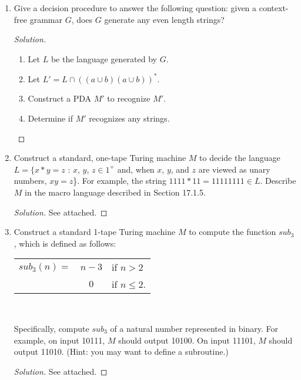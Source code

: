 \documentclass[10pt]{article}
\begin{document}
\begin{enumerate}[1)]

\item
Give a decision procedure to answer the following question: given a context-free grammar $G$, does $G$ generate any even length strings?
\begin{proof}[Solution]$ $\\
\begin{enumerate}[1.]
\item
Let $L$ be the language generated by $G$.
\item
Let $L' = L \cap ((a \cup b)(a \cup b))^*$.
\item
Construct a PDA $M'$ to recognize $M'$.
\item
Determine if $M'$ recognizes any strings.
\end{enumerate}
\end{proof}


\item
Construct a standard, one-tape Turing machine $M$ to decide the language $L = \{x * y = z$ : $x$, $y$, $z \in 1^+$ and, when  $x$,  $y$, and  $z$ are viewed as unary numbers,  $xy =  z$\}.  For example, the string  $1111*11=11111111 \in L$.  Describe $M$ in the macro language described in Section 17.1.5.
\begin{proof}[Solution]
See attached.
\end{proof}


\pagebreak

\item
Construct a standard 1-tape Turing machine $M$ to compute the function $sub_3$, which is defined as follows:
\begin{center}
\begin{tabular}{l c l}
$sub_3(n) =$&$n-3$ &if $n > 2$\\
&$0$&if $n \leq 2$.\\
\end{tabular}\\
\end{center}
Specifically, compute  $sub_3$ of a natural number represented in binary.  For example, on input 10111, $M$ should output 10100.  On input 11101, $M$ should output 11010.  (Hint: you may want to define a subroutine.)
\begin{proof}[Solution]
See attached.
\end{proof}
\end{enumerate}
\end{document}
